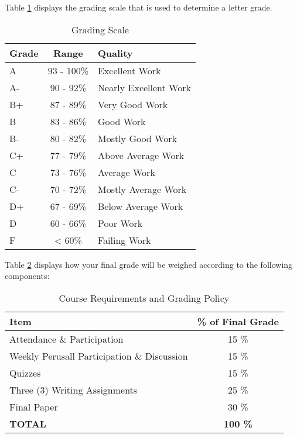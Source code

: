 \documentclass[11pt,]{article}
\begin{document}
Table \ref{tab:grade_scale} displays the grading scale that is used to
determine a letter grade.

\renewcommand{\arraystretch}{1.5}

\begin{table}[!h]

\caption{\label{tab:grade_scale}Grading Scale}
\centering
\fontsize{10}{12}\selectfont
\begin{tabular}[t]{l|c|l}
\hline
\textbf{Grade} & \textbf{Range} & \textbf{Quality}\\
\hline
A & 93 - 100\% & Excellent Work\\
\hline
A- & 90 - 92\% & Nearly Excellent Work\\
\hline
B+ & 87 - 89\% & Very Good Work\\
\hline
B & 83 - 86\% & Good Work\\
\hline
B- & 80 - 82\% & Mostly Good Work\\
\hline
C+ & 77 - 79\% & Above Average Work\\
\hline
C & 73 - 76\% & Average Work\\
\hline
C- & 70 - 72\% & Mostly Average Work\\
\hline
D+ & 67 - 69\% & Below Average Work\\
\hline
D & 60 - 66\% & Poor Work\\
\hline
F & < 60\% & Failing Work\\
\hline
\end{tabular}
\end{table}

Table \ref{tab:weight_table} displays how your final grade will be
weighed according to the following components:

\renewcommand{\arraystretch}{1.5}

\begin{table}[!h]

\caption{\label{tab:weight_table}Course Requirements and Grading Policy}
\centering
\fontsize{10}{12}\selectfont
\begin{tabular}[t]{lc}
\toprule
\textbf{Item} & \textbf{\% of Final Grade}\\
\midrule
Attendance \& Participation & 15 \%\\
Weekly Perusall Participation \& Discussion & 15 \%\\
Quizzes & 15 \%\\
Three (3) Writing Assignments & 25 \%\\
Final Paper & 30 \%\\
\addlinespace
\textbf{TOTAL} & \textbf{100 \%}\\
\midrule
\bottomrule
\end{tabular}
\end{table}
\end{document}
